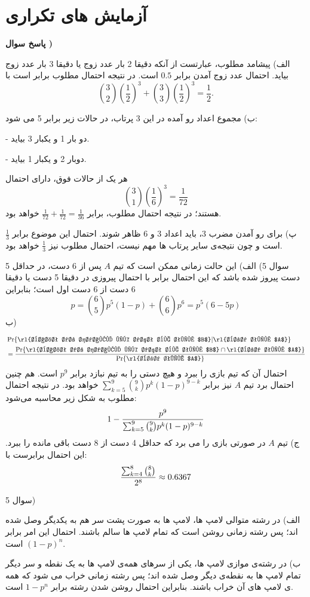\documentclass[10pt,letterpaper]{report}
\newcounter{questionanswernumber}
\newcommand{\QA}{
\textbf{پاسخ سوال \thequestionanswernumber)}
\stepcounter{questionanswernumber}
}
\newcommand{\eqn}[1]{
\[\begin{split}
#1
\end{split}\]
}
\begin{document}
\chapter{آزمایش های تکراری}

\QA

الف) پیشامد مطلوب، عبارتست از آنکه دقیقا 2 بار عدد زوج یا دقیقا 3 بار عدد زوج بیاید. احتمال عدد زوج آمدن برابر $0.5$ است. در نتیجه احتمال مطلوب برابر است با
$$
\binom{3}{2}(\frac{1}{2})^3+\binom{3}{3}(\frac{1}{2})^3=\frac{1}{2}.
$$

ب) مجموع اعداد رو آمده در این 3 پرتاب، در حالات زیر برابر 5 می شود:

- دو بار 1 و یکبار 3 بیاید.

- دوبار 2 و یکبار 1 بیاید.

هر یک از حالات فوق، دارای احتمال
$$
\binom{3}{1}(\frac{1}{6})^3=\frac{1}{72}
$$
هستند؛ در نتیجه احتمال مطلوب، برابر 
$
\frac{1}{72}+\frac{1}{72}=\frac{1}{36}
$
خواهد بود.

پ) برای رو آمدن مضرب 3، باید اعداد 3 و 6 ظاهر شوند. احتمال این موضوع برابر 
$
\frac{1}{3}
$
است و چون نتیجه‌ی سایر پرتاب ها مهم نیست، احتمال مطلوب نیز 
$
\frac{1}{3}
$
خواهد بود.

سوال 5) الف) این حالت زمانی ممکن است که تیم $A$ پس از 6 دست، در حداقل 5 دست پیروز شده باشد که این احتمال برابر با احتمال پیروزی در دقیقا 5 دست یا دقیقا 6 دست از 6 دست اول است؛ بنابراین
$$
p=\binom{6}{5}p^5(1-p)+\binom{6}{6}p^6=p^5(6-5p)
$$
ب) 
\eqn{
&\Pr\{
\text{\rl{باخت در حداقل یک دست به تیم $B$}}|\text{\rl{برد تیم $A$}}
\}
\\&=
{
\Pr\{
\text{\rl{باخت در حداقل یک دست به تیم $B$}}\cap\text{\rl{برد تیم $A$}}
\}
\over
\Pr\{
\text{\rl{برد تیم $A$}}
\}
}
}{}
احتمال آن که تیم  بازی را ببرد و هیچ دستی را به تیم  نبازد برابر $p^9$ است. هم چنین احتمال برد تیم $A$ نیز برابر 
$
\sum_{k=5}^{9}\binom{9}{k}p^k(1-p)^{9-k}
$
 خواهد بود. در نتیجه احتمال مطلوب به شکل زیر محاسبه می‌شود:
$$
1-{p^9\over \sum_{k=5}^{9}\binom{9}{k}p^k(1-p)^{9-k}}
$$
ج) تیم $A$ در صورتی بازی را می برد که حداقل 4 دست از 8 دست باقی مانده را ببرد. این احتمال برابرست با:
$$
{\sum_{k=4}^{8}\binom{8}{k}\over 2^8}\approx 0.6367
$$

سوال 5)

الف) در رشته متوالی لامپ ها، لامپ ها به صورت پشت سر هم به یکدیگر وصل شده اند؛ پس رشته زمانی روشن است که تمام لامپ ها سالم باشند. احتمال این امر برابر 
$
(1-p)^n
$
است.

ب) در رشته‌ی موازی لامپ ها، یکی از سرهای همه‌ی لامپ ها به یک نقطه و سر دیگر تمام لامپ ها به نقطه‌ی دیگر وصل شده اند؛ پس رشته زمانی خراب می شود که همه ی لامپ های آن خراب باشند. بنابراین احتمال روشن شدن رشته برابر 
$
1-p^n
$
است.
\end{document}
